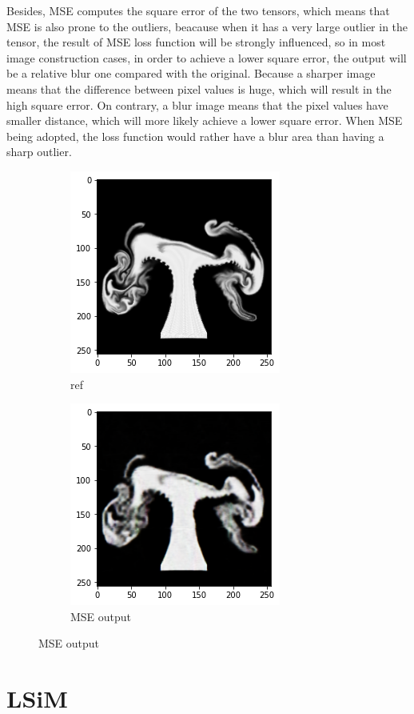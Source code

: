 \documentclass[a4paper,12pt,twoside]{report}
\begin{document}
Besides, MSE computes the square error of the two tensors, which means that MSE is also prone to the outliers, beacause when it has a very large outlier in the tensor, the result of MSE loss function will be strongly influenced, so in most image construction cases, in order to achieve a lower square error, the output will be a relative blur one compared with the original. Because a sharper image means that the difference between pixel values is huge, which will result in the high square error. On contrary, a blur image means that the pixel values have smaller distance, which will more likely achieve a lower square error. When MSE being adopted, the loss function would rather have a blur area than having a sharp outlier.
\begin{figure}
\centering
\begin{subfigure}{0.4\textwidth}
  \centering
  \includegraphics[scale=0.5]{MSEref.png}
  \caption{ref}
\end{subfigure}
\begin{subfigure}{0.4\textwidth}
  \centering
  \includegraphics[scale=0.5]{MSEblur.png}
  \caption{MSE output}
\end{subfigure}
\end{figure}
 
\section{LSiM}
\end{document}
